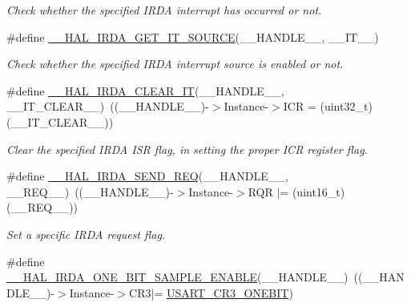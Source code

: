 \begin{DoxyCompactItemize}
\begin{DoxyCompactList}\small\item\em Check whether the specified I\+R\+DA interrupt has occurred or not. \end{DoxyCompactList}\item 
\#define \hyperlink{group___i_r_d_a___exported___macros_ga1c50dd0407d6e4159f90c9bc74545925}{\+\_\+\+\_\+\+H\+A\+L\+\_\+\+I\+R\+D\+A\+\_\+\+G\+E\+T\+\_\+\+I\+T\+\_\+\+S\+O\+U\+R\+CE}(\+\_\+\+\_\+\+H\+A\+N\+D\+L\+E\+\_\+\+\_\+,  \+\_\+\+\_\+\+I\+T\+\_\+\+\_\+)
\begin{DoxyCompactList}\small\item\em Check whether the specified I\+R\+DA interrupt source is enabled or not. \end{DoxyCompactList}\item 
\#define \hyperlink{group___i_r_d_a___exported___macros_ga61d6c077cb8badf347489bb20fbc3c02}{\+\_\+\+\_\+\+H\+A\+L\+\_\+\+I\+R\+D\+A\+\_\+\+C\+L\+E\+A\+R\+\_\+\+IT}(\+\_\+\+\_\+\+H\+A\+N\+D\+L\+E\+\_\+\+\_\+,  \+\_\+\+\_\+\+I\+T\+\_\+\+C\+L\+E\+A\+R\+\_\+\+\_\+)~((\+\_\+\+\_\+\+H\+A\+N\+D\+L\+E\+\_\+\+\_\+)-\/$>$Instance-\/$>$I\+CR = (uint32\+\_\+t)(\+\_\+\+\_\+\+I\+T\+\_\+\+C\+L\+E\+A\+R\+\_\+\+\_\+))
\begin{DoxyCompactList}\small\item\em Clear the specified I\+R\+DA I\+SR flag, in setting the proper I\+CR register flag. \end{DoxyCompactList}\item 
\#define \hyperlink{group___i_r_d_a___exported___macros_ga569f44033f99248f209c83c75e65fa8a}{\+\_\+\+\_\+\+H\+A\+L\+\_\+\+I\+R\+D\+A\+\_\+\+S\+E\+N\+D\+\_\+\+R\+EQ}(\+\_\+\+\_\+\+H\+A\+N\+D\+L\+E\+\_\+\+\_\+,  \+\_\+\+\_\+\+R\+E\+Q\+\_\+\+\_\+)~((\+\_\+\+\_\+\+H\+A\+N\+D\+L\+E\+\_\+\+\_\+)-\/$>$Instance-\/$>$R\+QR $\vert$= (uint16\+\_\+t)(\+\_\+\+\_\+\+R\+E\+Q\+\_\+\+\_\+))
\begin{DoxyCompactList}\small\item\em Set a specific I\+R\+DA request flag. \end{DoxyCompactList}\item 
\#define \hyperlink{group___i_r_d_a___exported___macros_ga2af9a200c672b78abfec855501b15fe9}{\+\_\+\+\_\+\+H\+A\+L\+\_\+\+I\+R\+D\+A\+\_\+\+O\+N\+E\+\_\+\+B\+I\+T\+\_\+\+S\+A\+M\+P\+L\+E\+\_\+\+E\+N\+A\+B\+LE}(\+\_\+\+\_\+\+H\+A\+N\+D\+L\+E\+\_\+\+\_\+)~((\+\_\+\+\_\+\+H\+A\+N\+D\+L\+E\+\_\+\+\_\+)-\/$>$Instance-\/$>$C\+R3$\vert$= \hyperlink{group___peripheral___registers___bits___definition_ga9a96fb1a7beab602cbc8cb0393593826}{U\+S\+A\+R\+T\+\_\+\+C\+R3\+\_\+\+O\+N\+E\+B\+IT})

\end{DoxyCompactItemize}
